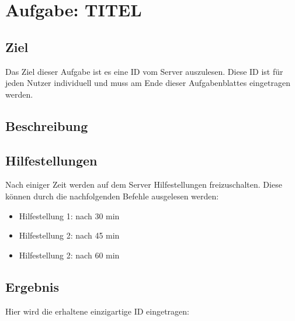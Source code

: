 \chapter{Aufgabe: TITEL}

\section{Ziel}
Das Ziel dieser Aufgabe ist es eine ID vom Server auszulesen.
Diese ID ist für jeden Nutzer individuell und muss am Ende dieser Aufgabenblattes eingetragen werden.

\section{Beschreibung}

\section{Hilfestellungen}
Nach einiger Zeit werden auf dem Server Hilfestellungen freizuschalten. Diese können durch die nachfolgenden Befehle ausgelesen werden:

\begin{itemize}
\item Hilfestellung 1: nach 30 min
\item Hilfestellung 2: nach 45 min
\item Hilfestellung 2: nach 60 min
\end{itemize}

\section{Ergebnis}
Hier wird die erhaltene einzigartige ID eingetragen:
\\
\\

\underline{\hspace{1cm}} 
\underline{\hspace{1cm}} 
\underline{\hspace{1cm}} 
\underline{\hspace{1cm}} 
\underline{\hspace{1cm}} 
\underline{\hspace{1cm}} 
\underline{\hspace{1cm}} 
\underline{\hspace{1cm}} 
\underline{\hspace{1cm}} 
\underline{\hspace{1cm}} 
